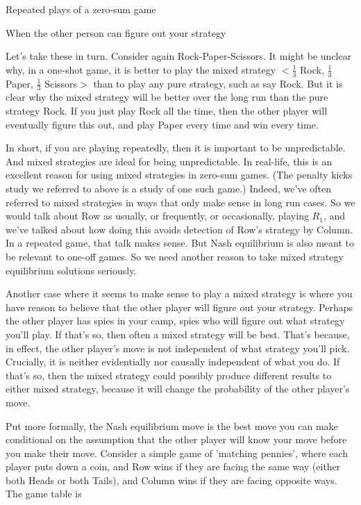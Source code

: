 \begin{itemize*}
\item Repeated plays of a zero-sum game
\item When the other person can figure out your strategy
\end{itemize*}

Let's take these in turn. Consider again Rock-Paper-Scissors. It might be unclear why, in a one-shot game, it is better to play the mixed strategy $<$$\frac{1}{3}$ Rock, $\frac{1}{3}$ Paper, $\frac{1}{3}$ Scissors$>$ than to play any pure strategy, such as say Rock. But it is clear why the mixed strategy will be better over the long run than the pure strategy Rock. If you just play Rock all the time, then the other player will eventually figure this out, and play Paper every time and win every time.

In short, if you are playing repeatedly, then it is important to be unpredictable. And mixed strategies are ideal for being unpredictable. In real-life, this is an excellent reason for using mixed strategies in zero-sum games. (The penalty kicks study we referred to above is a study of one such game.) Indeed, we've often referred to mixed strategies in ways that only make sense in long run cases. So we would talk about Row as usually, or frequently, or occasionally, playing $R_1$, and we've talked about how doing this avoids detection of Row's strategy by Column. In a repeated game, that talk makes sense. But Nash equilibrium is also meant to be relevant to one-off games. So we need another reason to take mixed strategy equilibrium solutions seriously.

Another case where it seems to make sense to play a mixed strategy is where you have reason to believe that the other player will figure out your strategy. Perhaps the other player has spies in your camp, spies who will figure out what strategy you'll play. If that's so, then often a mixed strategy will be best. That's because, in effect, the other player's move is not independent of what strategy you'll pick. Crucially, it is neither evidentially nor causally independent of what you do. If that's so, then the mixed strategy could possibly produce different results to either mixed strategy, because it will change the probability of the other player's move.

Put more formally, the Nash equilibrium move is the best move you can make conditional on the assumption that the other player will know your move before you make their move. Consider a simple game of 'matching pennies', where each player puts down a coin, and Row wins if they are facing the same way (either both Heads or both Tails), and Column wins if they are facing opposite ways. The game table is

